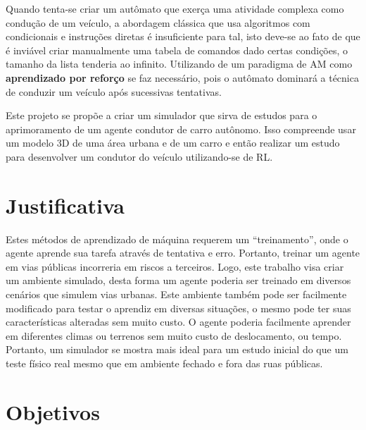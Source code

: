 Quando tenta-se criar um autômato que exerça uma atividade complexa como condução de um veículo, a abordagem clássica que usa algoritmos com condicionais e instruções diretas é insuficiente para tal, isto deve-se ao fato de que é inviável criar manualmente uma tabela de comandos dado certas condições, o tamanho da lista tenderia ao infinito. Utilizando de um paradigma de AM como \textbf{aprendizado por reforço} se faz necessário, pois o autômato dominará a técnica de conduzir um veículo após sucessivas tentativas.

Este projeto se propõe a criar um simulador que sirva de estudos para o aprimoramento de um agente condutor de carro autônomo. Isso compreende usar um modelo 3D de uma área urbana e de um carro e então realizar um estudo para desenvolver um condutor do veículo utilizando-se de RL.



\section*{Justificativa}\label{sec:justificativa}
Estes métodos de aprendizado de máquina requerem um ``treinamento'', onde o agente aprende sua tarefa através de tentativa e erro. Portanto, treinar um agente em vias públicas incorreria em riscos a terceiros. Logo, este trabalho visa criar um ambiente simulado, desta forma um agente poderia ser treinado em diversos cenários que simulem vias urbanas. Este ambiente também pode ser facilmente modificado para testar o aprendiz em diversas situações, o mesmo pode ter suas características alteradas sem muito custo. O agente poderia facilmente aprender em diferentes climas ou terrenos sem muito custo de deslocamento, ou tempo. Portanto, um simulador se mostra mais ideal para um estudo inicial do que um teste físico real mesmo que em ambiente fechado e fora das ruas públicas.

\section*{Objetivos}\label{sec:objetivos}
